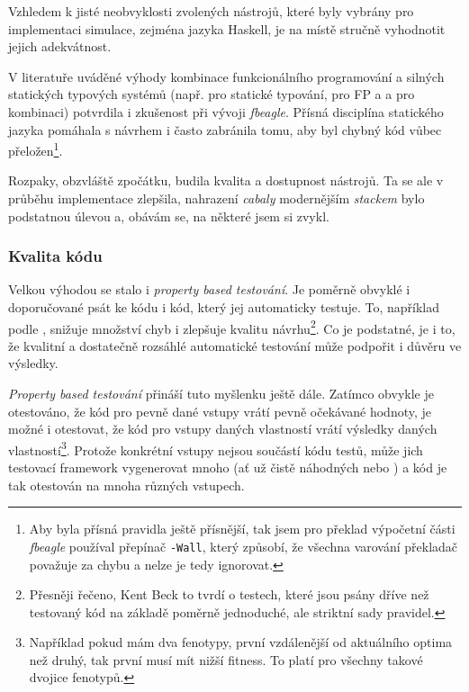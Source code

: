 \begin{tcolorbox}[title={Vhodnost zvolených nástrojů pro simulaci}
                 , breakable
                 ]

Vzhledem k jisté neobvyklosti zvolených nástrojů, které byly vybrány pro implementaci simulace, zejména jazyka Haskell,
je na místě stručně vyhodnotit jejich adekvátnost.

V literatuře uváděné výhody kombinace funkcionálního programování a silných statických typových systémů (např. \citet{meijer2004static} pro
statické typování, \citet{hughes1989functional} pro FP a \citet{Chiusano2016} a \citet{ray2014large} pro kombinaci)
potvrdila i zkušenost při vývoji
\textit{fbeagle}. Přísná disciplína statického jazyka pomáhala s návrhem i často zabránila tomu, aby byl chybný kód vůbec přeložen\footnote{
Aby byla přísná pravidla ještě přísnější, tak jsem pro překlad výpočetní části \textit{fbeagle} používal přepínač \texttt{-Wall}, který způsobí,
že všechna varování překladač považuje za chybu a nelze je tedy ignorovat.
}.

Rozpaky, obzvláště zpočátku, budila kvalita a dostupnost nástrojů. Ta se ale v průběhu implementace zlepšila, nahrazení \textit{cabaly} modernějším
\textit{stackem} bylo podstatnou úlevou a, obávám se, na některé  jsem si zvykl.

\subsubsection*{Kvalita kódu}

Velkou výhodou se stalo i \textit{property based testování}. Je poměrně obvyklé i doporučované \citep{williams2009effectiveness} psát ke kódu i kód, který jej
automaticky testuje. To, například podle \citet{beck2003test}, snižuje množství chyb i zlepšuje kvalitu návrhu\footnote{
Přesněji řečeno, Kent Beck to tvrdí o testech, které jsou psány dříve než testovaný kód na základě poměrně jednoduché,
ale striktní sady pravidel.}.
Co je podstatné, je i to, že kvalitní a dostatečně rozsáhlé automatické testování může podpořit i důvěru ve výsledky.

\textit{Property based testování} přináší tuto myšlenku ještě dále. Zatímco obvykle je otestováno, že kód pro pevně dané vstupy vrátí pevně
očekávané hodnoty, je možné i otestovat, že kód pro vstupy daných vlastností vrátí výsledky daných vlastností\footnote{
Například pokud mám dva fenotypy, první vzdálenější od aktuálního optima než druhý, tak první musí mít nižší fitness.
To platí pro všechny takové dvojice fenotypů.
}. Protože konkrétní vstupy nejsou součástí kódu testů, může jich testovací framework vygenerovat mnoho (ať už čistě náhodných nebo )
a kód je tak otestován na mnoha různých vstupech.


\end{tcolorbox}
